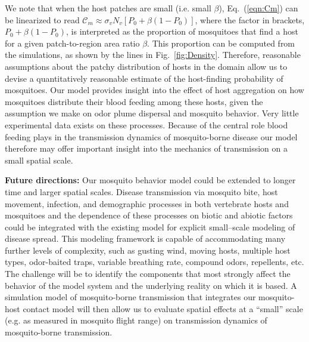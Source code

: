 \documentclass[10pt]{article}
\begin{document}
We note that when the host patches are small (i.e. small $\beta$), Eq.~(\ref{eqn:Cm}) can
be linearized to read $\mathcal{C}_m \approx \sigma_v N_v [ P_0 + \beta(1-P_0) ]$, where
the factor in brackets, $P_0 + \beta(1-P_0)$, is interpreted as the proportion of mosquitoes 
that find a host for a given patch-to-region area ratio $\beta$.  This proportion can be computed from the 
simulations, as shown by the lines in Fig.~\ref{fig:Density}.
Therefore, reasonable assumptions about the patchy distribution of hosts in the domain allow us to devise a quantitatively reasonable estimate of the host-finding probability of mosquitoes.
Our model provides insight into the effect of host aggregation on how mosquitoes distribute their blood feeding among these hosts, given the assumption we make on odor plume dispersal and mosquito behavior. Very little experimental data exists on these processes. Because of the central role blood feeding plays in the transmission dynamics of mosquito-borne disease our model therefore may offer important insight into the mechanics of transmission on a small spatial scale.

\textbf{Future directions:} Our mosquito behavior model could be extended to longer time and larger spatial scales. Disease transmission via mosquito bite, host movement, infection, and demographic processes in both vertebrate hosts and mosquitoes and the dependence of these processes on biotic and abiotic factors could be integrated with the existing model for explicit small--scale modeling of disease spread. This modeling framework is capable of accommodating many further levels of complexity, such as gusting wind, moving hosts, multiple host types, odor-baited traps, variable breathing rate, compound odors, repellents, etc. The challenge will be to identify the components that most strongly affect the behavior of the model system and the underlying reality on which it is based.
%
A simulation model of mosquito-borne transmission that integrates our mosquito-host contact model will then allow us to evaluate spatial effects  at a ``small'' scale (e.g. as measured in mosquito flight range) on transmission dynamics of mosquito-borne transmission.
\end{document}
